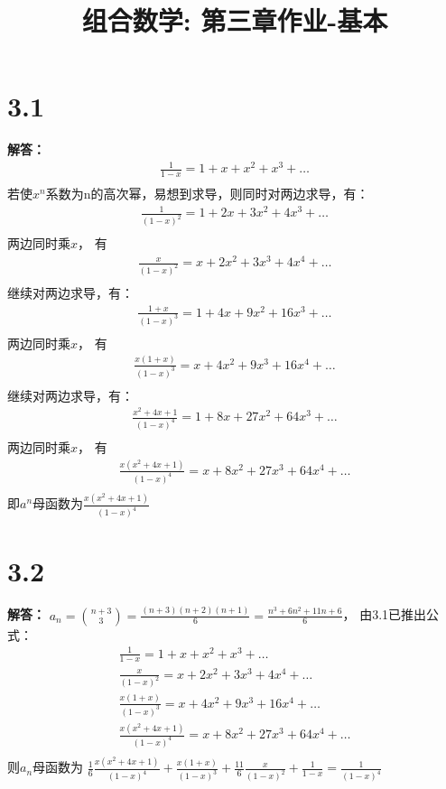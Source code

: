 \documentclass{article}
\title{组合数学: 第三章作业-基本}
\begin{document}
\maketitle

\section*{3.1}
\textbf{解答：}
\begin{gather*}
    \frac{1}{1 - x} = 1 + x + x^2 + x^3 + \dots \\
\end{gather*} 
若使$x^n$系数为n的高次幂，易想到求导，则同时对两边求导，有：
\begin{gather*}
    \frac{1}{(1 - x)^2} = 1 + 2x + 3x^2 + 4x^3 + \dots \\
\end{gather*} 
两边同时乘$x$， 有
\begin{gather*}
    \frac{x}{(1 - x)^2} = x + 2x^2 + 3x^3 + 4x^4 + \dots \\
\end{gather*} 
继续对两边求导，有：
\begin{gather*}
    \frac{1 + x}{(1 - x)^3} = 1 + 4x + 9x^2 + 16x^3 + \dots \\
\end{gather*} 
两边同时乘$x$， 有
\begin{gather*}
    \frac{x(1 + x)}{(1 - x)^3} = x + 4x^2 + 9x^3 + 16x^4 + \dots \\
\end{gather*} 
继续对两边求导，有：
\begin{gather*}
    \frac{x^2 + 4x + 1}{(1 - x)^4} = 1 + 8x + 27x^2 + 64x^3 + \dots \\
\end{gather*} 
两边同时乘$x$， 有
\begin{gather*}
    \frac{x(x^2 + 4x + 1)}{(1 - x)^4} = x + 8x^2 + 27x^3 + 64x^4 + \dots \\
\end{gather*} 
即$a^n$母函数为$\frac{x(x^2 + 4x + 1)}{(1 - x)^4}$

\section*{3.2}
\textbf{解答：}
$a_n = \binom{n+3}{3} = \frac{(n + 3)(n + 2)(n + 1)}{6} = \frac{n^3 + 6n^2 + 11n + 6}{6} $，
由3.1已推出公式：
\begin{gather*}
    \frac{1}{1 - x} = 1 + x + x^2 + x^3 + \dots \\
    \frac{x}{(1 - x)^2} = x + 2x^2 + 3x^3 + 4x^4 + \dots \\
    \frac{x(1 + x)}{(1 - x)^3} = x + 4x^2 + 9x^3 + 16x^4 + \dots \\
    \frac{x(x^2 + 4x + 1)}{(1 - x)^4} = x + 8x^2 + 27x^3 + 64x^4 + \dots \\
\end{gather*} 
则$a_n$母函数为
$\frac{1}{6}\frac{x(x^2 + 4x + 1)}{(1 - x)^4} + \frac{x(1 + x)}{(1 - x)^3} + \frac{11}{6}\frac{x}{(1 - x)^2} + \frac{1}{1 - x} = \frac{1}{(1-x)^4}$
\end{document}
